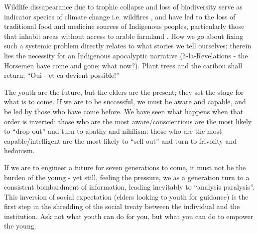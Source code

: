 \documentclass{report}
\begin{document}
Wildlife dissapearance due to trophic collapse and loss of biodiversity serve as indicator species of climate change i.e. wildfires \parencite{nwtcaribou}, and have led to the loss of traditional food and medicine sources of Indigenous peoples, particularly those that inhabit areas without access to arable farmland \parencite{jonassangris}. How we go about fixing such a systemic problem directly relates to what stories we tell ourselves: therein lies the necessity for an Indigenous apocalyptic narrative (à-la-Revelations - the Horsemen have come and gone; what now?). Plant trees and the caribou shall return; ``Oui - et ca devient possible!''

The youth are the future, but the elders are the present; they set the stage for what is to come. If we are to be successful, we must be aware and capable, and be led by those who have come before. We have seen what happens when that order is inverted: those who are the most aware/conscientious are the most likely to ``drop out'' and turn to apathy and nihilism; those who are the most capable/intelligent are the most likely to ``sell out'' and turn to frivolity and hedonism.

If we are to engineer a future for seven generations to come, it must not be the burden of the young - yet still, feeling the pressure, we as a generation turn to a consistent bombardment of information, leading inevitably to ``analysis paralysis''. This inversion of social expectation (elders looking to youth for guidance) is the first step in the shredding of the social treaty between the individual and the institution. Ask not what youth can do for you, but what you can do to empower the young.

\clearpage

\printbibliography
\end{document}
